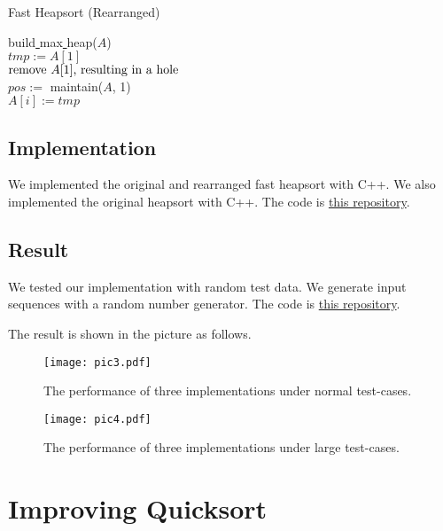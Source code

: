 \documentclass[12pt]{extarticle}
\newcommand{\<}{\langle}
\renewcommand{\>}{\rangle}
\theoremstyle{definition}
\newcommand{\udl}{\underline{ }}
\begin{document}
\begin{algorithm}[H]
	\caption{Fast Heapsort (Rearranged)}
	\label{algo:heapsort_improved_2}
	\LinesNumbered
	{\con build\udl max\udl heap($A$)} \\
		{
		{\con $tmp := A[1]$} \\
		$\textnormal{remove } A[1] \textnormal{, resulting in a hole}$ \\
		$pos :=$ {\con maintain($A$, 1)} \\
		\If{$pos < i$}{
			$A[pos] := A[i]$ \\
			{\con sift\udl up($A$, $pos$)}
		}
		$A[i] := tmp$	
	}
\end{algorithm}

\subsection{Implementation}

We implemented the original and rearranged fast heapsort with C++. We also implemented the original heapsort with C++. The code is \href{https://github.com/zqy1018/course_projects/tree/master/project_CS258/team_project}{this repository}.

\subsection{Result}

We tested our implementation with random test data. We generate input sequences with a random number generator. The code is \href{https://github.com/zqy1018/course_projects/tree/master/project_CS258/team_project}{this repository}.

The result is shown in the picture as follows.

\begin{figure}[H]
	\centering
	\texttt{[image: pic3.pdf]}
	\caption{The performance of three implementations under normal test-cases.}
	\label{fig:fig1}
\end{figure}

\begin{figure}[H]
	\centering
	\texttt{[image: pic4.pdf]}
	\caption{The performance of three implementations under large test-cases.}
	\label{fig:fig2}
\end{figure}

\section{Improving Quicksort}
\end{document}
